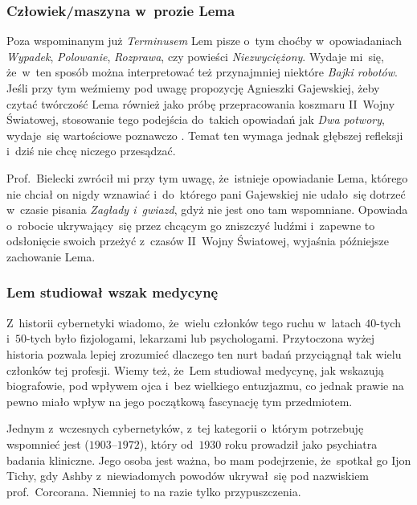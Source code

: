 \documentclass[10pt,t]{beamer}
\begin{document}
\begin{frame}
  \frametitle{Człowiek/maszyna w~prozie Lema}


  Poza wspominanym już \textit{Terminusem} Lem pisze o~tym choćby
  w~opowiadaniach \textit{Wypadek}, \textit{Polowanie}, \textit{Rozprawa},
  czy powieści \textit{Niezwyciężony}. Wydaje mi~się, że~w~ten sposób można
  interpretować też przynajmniej niektóre \textit{Bajki robotów}. Jeśli
  przy tym weźmiemy pod uwagę propozycję Agnieszki Gajewskiej, żeby czytać
  twórczość Lema również jako próbę przepracowania koszmaru II~Wojny
  Światowej, stosowanie tego podejścia do~takich opowiadań jak
  \textit{Dwa potwory}, wydaje~się wartościowe poznawczo
  \parencite{Gajewska-Zaglada-i-gwiazdy-Pub-2017}. Temat ten wymaga jednak
  głębszej refleksji i~dziś nie chcę niczego przesądzać.

  Prof.~Bielecki zwrócił mi przy tym uwagę, że~istnieje opowiadanie Lema,
  którego nie chciał on nigdy wznawiać i~do~którego pani Gajewskiej
  nie udało~się dotrzeć w~czasie pisania \textit{Zagłady i~gwiazd}, gdyż
  nie jest ono tam wspomniane. Opowiada o~robocie ukrywający~się przez
  chcącym go zniszczyć ludźmi i~zapewne to odsłonięcie swoich przeżyć
  z~czasów II~Wojny Światowej, wyjaśnia późniejsze zachowanie Lema.

\end{frame}





\begin{frame}
  \frametitle{Lem studiował wszak medycynę}


  Z~historii cybernetyki wiadomo, że~wielu członków tego ruchu w~latach
  $40$-tych i~$50$-tych było fizjologami, lekarzami lub psychologami.
  Przytoczona wyżej historia pozwala lepiej zrozumieć dlaczego ten nurt
  badań przyciągnął tak wielu członków tej profesji. Wiemy też, że~Lem
  studiował medycynę, jak wskazują biografowie, pod wpływem ojca i~bez
  wielkiego entuzjazmu, co jednak prawie na pewno miało wpływ na
  jego początkową fascynację tym przedmiotem.

  Jednym z~wczesnych cybernetyków, z~tej kategorii o~którym potrzebuję
  wspomnieć jest
   ($1903\text{--}1972$), który od~$1930$ roku prowadził
  jako psychiatra badania kliniczne. Jego osoba jest ważna, bo mam
  podejrzenie,
  że~spotkał go Ijon Tichy, gdy Ashby z~niewiadomych powodów ukrywał~się
  pod nazwiskiem prof.~Corcorana. Niemniej to na razie tylko przypuszczenia.

\end{frame}
\end{document}
